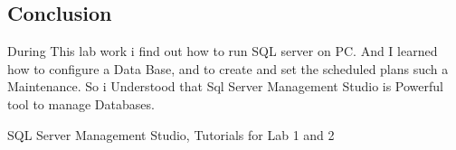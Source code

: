 \documentclass[12pt]{article}
\begin{document}
        \subsection*{Conclusion}
        During This lab work i find out how to  run SQL server on PC.  And I learned how to configure a Data Base, and to create and set the scheduled plans such a Maintenance. So i Understood that Sql Server Management Studio is Powerful tool to manage Databases.
        \cite{SQLServerManagementStudio}
        

 
\medskip
 
\begin{thebibliography}{9}
SQL Server Management Studio, Tutorials for Lab 1 and 2

\end{thebibliography}
                
\end{document}
